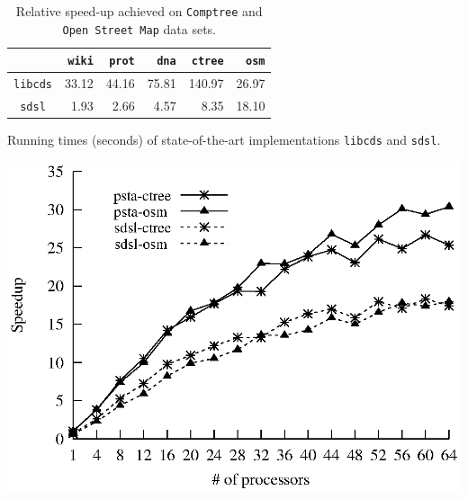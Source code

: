 \begin{table}[H]
{{\begin{minipage}[b]{0.48\hsize}
      \label{tbl:parallelTimes}
    \end{minipage}
    \hfill
    \begin{minipage}[b]{0.48\hsize}\centering
      \begin{tabular}{c|rrrrr}
        & {\tt wiki} & {\tt prot} & {\tt dna} & {\tt ctree} & {\tt osm}\\
        \hline
        \hline
        {\tt libcds} & 33.12 & 44.16 & 75.81 & 140.97 & 26.97 \\
        {\tt sdsl} & 1.93 & 2.66 & 4.57 & 8.35 & 18.10 \\
        \hline
      \end{tabular}
      \caption{Running times (seconds) of state-of-the-art implementations {\tt libcds} and {\tt sdsl}.}
      \label{tbl:sequetialTimes}

      \includegraphics[scale=0.5]{./images/speedup}
      \caption{Relative speed-up achieved on {\tt Comptree} and {\tt Open Street Map} data sets.}
      \label{fig:speedup}

    \end{minipage}
}}
\end{table}


